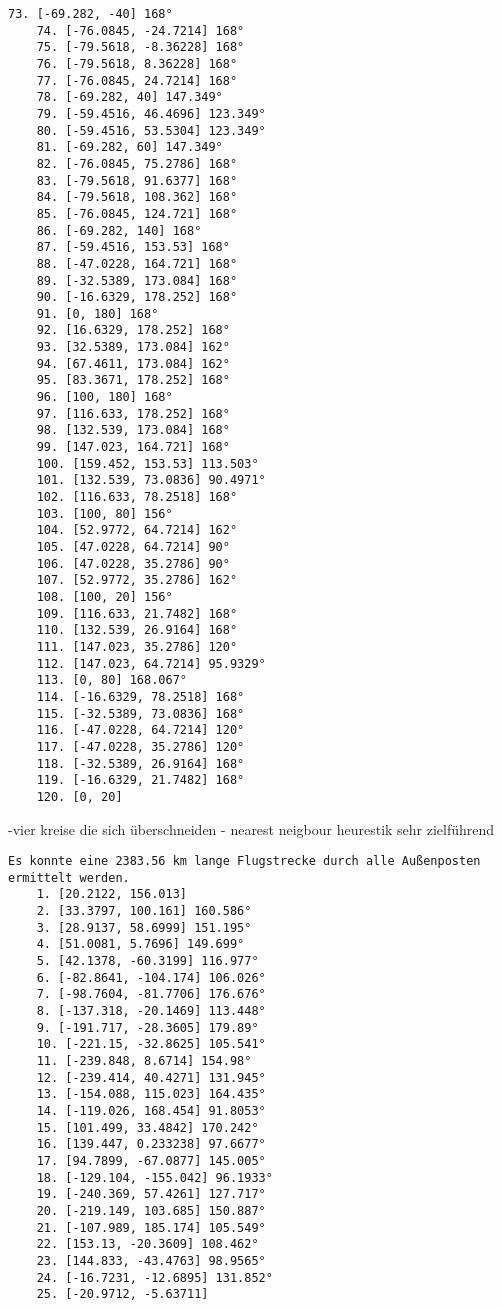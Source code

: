 \documentclass[a4paper,10pt,ngerman]{scrartcl}
\begin{document}
\begin{lstlisting}[frame=single, title=Programmausgabe wenigerkrumm3.txt, breaklines=true,label={lst:lstlisting4}]
    73. [-69.282, -40] 168°
    74. [-76.0845, -24.7214] 168°
    75. [-79.5618, -8.36228] 168°
    76. [-79.5618, 8.36228] 168°
    77. [-76.0845, 24.7214] 168°
    78. [-69.282, 40] 147.349°
    79. [-59.4516, 46.4696] 123.349°
    80. [-59.4516, 53.5304] 123.349°
    81. [-69.282, 60] 147.349°
    82. [-76.0845, 75.2786] 168°
    83. [-79.5618, 91.6377] 168°
    84. [-79.5618, 108.362] 168°
    85. [-76.0845, 124.721] 168°
    86. [-69.282, 140] 168°
    87. [-59.4516, 153.53] 168°
    88. [-47.0228, 164.721] 168°
    89. [-32.5389, 173.084] 168°
    90. [-16.6329, 178.252] 168°
    91. [0, 180] 168°
    92. [16.6329, 178.252] 168°
    93. [32.5389, 173.084] 162°
    94. [67.4611, 173.084] 162°
    95. [83.3671, 178.252] 168°
    96. [100, 180] 168°
    97. [116.633, 178.252] 168°
    98. [132.539, 173.084] 168°
    99. [147.023, 164.721] 168°
    100. [159.452, 153.53] 113.503°
    101. [132.539, 73.0836] 90.4971°
    102. [116.633, 78.2518] 168°
    103. [100, 80] 156°
    104. [52.9772, 64.7214] 162°
    105. [47.0228, 64.7214] 90°
    106. [47.0228, 35.2786] 90°
    107. [52.9772, 35.2786] 162°
    108. [100, 20] 156°
    109. [116.633, 21.7482] 168°
    110. [132.539, 26.9164] 168°
    111. [147.023, 35.2786] 120°
    112. [147.023, 64.7214] 95.9329°
    113. [0, 80] 168.067°
    114. [-16.6329, 78.2518] 168°
    115. [-32.5389, 73.0836] 168°
    116. [-47.0228, 64.7214] 120°
    117. [-47.0228, 35.2786] 120°
    118. [-32.5389, 26.9164] 168°
    119. [-16.6329, 21.7482] 168°
    120. [0, 20]
    \end{lstlisting}

    -vier kreise die sich überschneiden
    - nearest neigbour heurestik sehr zielführend

    \begin{lstlisting}[frame=single, title=Programmausgabe wenigerkrumm4.txt, breaklines=true,label={lst:lstlisting4}]
    Es konnte eine 2383.56 km lange Flugstrecke durch alle Außenposten ermittelt werden.
    1. [20.2122, 156.013]
    2. [33.3797, 100.161] 160.586°
    3. [28.9137, 58.6999] 151.195°
    4. [51.0081, 5.7696] 149.699°
    5. [42.1378, -60.3199] 116.977°
    6. [-82.8641, -104.174] 106.026°
    7. [-98.7604, -81.7706] 176.676°
    8. [-137.318, -20.1469] 113.448°
    9. [-191.717, -28.3605] 179.89°
    10. [-221.15, -32.8625] 105.541°
    11. [-239.848, 8.6714] 154.98°
    12. [-239.414, 40.4271] 131.945°
    13. [-154.088, 115.023] 164.435°
    14. [-119.026, 168.454] 91.8053°
    15. [101.499, 33.4842] 170.242°
    16. [139.447, 0.233238] 97.6677°
    17. [94.7899, -67.0877] 145.005°
    18. [-129.104, -155.042] 96.1933°
    19. [-240.369, 57.4261] 127.717°
    20. [-219.149, 103.685] 150.887°
    21. [-107.989, 185.174] 105.549°
    22. [153.13, -20.3609] 108.462°
    23. [144.833, -43.4763] 98.9565°
    24. [-16.7231, -12.6895] 131.852°
    25. [-20.9712, -5.63711]
    \end{lstlisting}
\end{document}
